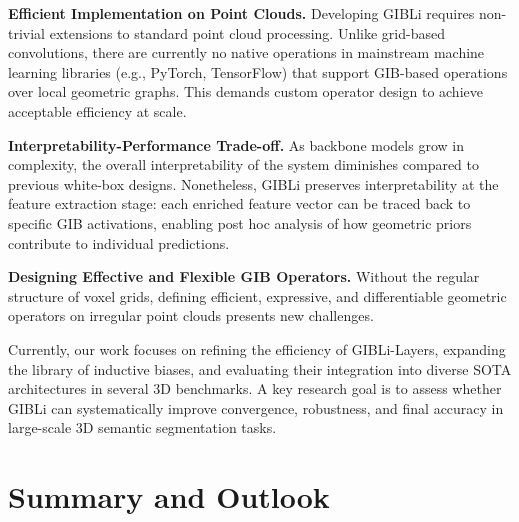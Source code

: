 \textbf{Efficient Implementation on Point Clouds.} \;
Developing GIBLi requires non-trivial extensions to standard point cloud processing.
Unlike grid-based convolutions, there are currently no native operations in
mainstream machine learning libraries (e.g., PyTorch, TensorFlow) that support
GIB-based operations over local geometric graphs. This demands custom operator
design to achieve acceptable efficiency at scale.

\textbf{Interpretability-Performance Trade-off.} \;
As backbone models grow in complexity, the overall interpretability of the
system diminishes compared to previous white-box designs.
Nonetheless, GIBLi preserves interpretability at the feature extraction stage:
each enriched feature vector can be traced back to specific GIB activations,
enabling post hoc analysis of how geometric priors contribute to individual predictions.

\textbf{Designing Effective and Flexible GIB Operators.} \;
Without the regular structure of voxel grids, defining efficient, expressive,
and differentiable geometric operators on irregular point clouds presents new
challenges.

Currently, our work focuses on refining the efficiency of GIBLi-Layers,
expanding the library of inductive biases, and evaluating their integration
into diverse SOTA architectures in several 3D benchmarks. A key research goal
is to assess whether GIBLi can systematically improve convergence, robustness,
and final accuracy in large-scale 3D semantic segmentation tasks.

\section{Summary and Outlook}\label{sec:summary_outlook}

